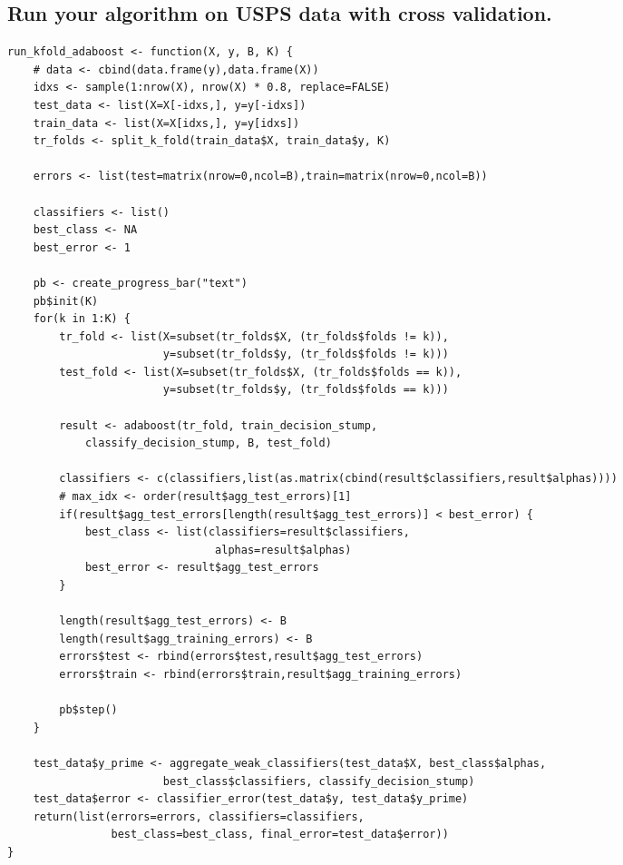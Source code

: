 \documentclass[11pt]{article}
\theoremstyle{quest}
\newcommand{\subproblem}[1]{\subsection{#1}}      %
\begin{document}
\subproblem{Run your algorithm on USPS data with cross validation.}
\begin{adjustwidth}{3.5em}{0em}  
\begin{lstlisting}
run_kfold_adaboost <- function(X, y, B, K) {
    # data <- cbind(data.frame(y),data.frame(X))
    idxs <- sample(1:nrow(X), nrow(X) * 0.8, replace=FALSE)
    test_data <- list(X=X[-idxs,], y=y[-idxs])
    train_data <- list(X=X[idxs,], y=y[idxs])
    tr_folds <- split_k_fold(train_data$X, train_data$y, K)

    errors <- list(test=matrix(nrow=0,ncol=B),train=matrix(nrow=0,ncol=B))

    classifiers <- list()
    best_class <- NA
    best_error <- 1

    pb <- create_progress_bar("text")
    pb$init(K)
    for(k in 1:K) {
        tr_fold <- list(X=subset(tr_folds$X, (tr_folds$folds != k)),
                        y=subset(tr_folds$y, (tr_folds$folds != k)))
        test_fold <- list(X=subset(tr_folds$X, (tr_folds$folds == k)),
                        y=subset(tr_folds$y, (tr_folds$folds == k)))

        result <- adaboost(tr_fold, train_decision_stump,
            classify_decision_stump, B, test_fold)

        classifiers <- c(classifiers,list(as.matrix(cbind(result$classifiers,result$alphas))))
        # max_idx <- order(result$agg_test_errors)[1]
        if(result$agg_test_errors[length(result$agg_test_errors)] < best_error) {
            best_class <- list(classifiers=result$classifiers,
                                alphas=result$alphas)
            best_error <- result$agg_test_errors
        }

        length(result$agg_test_errors) <- B
        length(result$agg_training_errors) <- B
        errors$test <- rbind(errors$test,result$agg_test_errors)
        errors$train <- rbind(errors$train,result$agg_training_errors)

        pb$step()
    }

    test_data$y_prime <- aggregate_weak_classifiers(test_data$X, best_class$alphas, 
                        best_class$classifiers, classify_decision_stump)
    test_data$error <- classifier_error(test_data$y, test_data$y_prime)
    return(list(errors=errors, classifiers=classifiers,
                best_class=best_class, final_error=test_data$error))
}
\end{lstlisting}
\end{adjustwidth}
\end{document}
